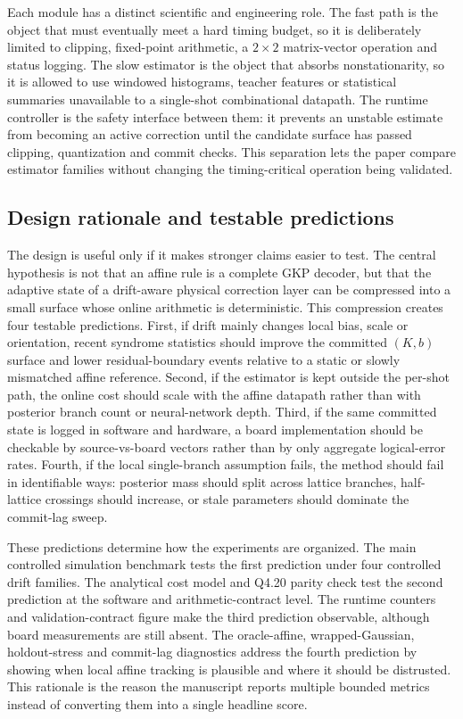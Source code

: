 \documentclass[11pt]{article}
\newcommand{\softwarehil}{controlled simulation}
\begin{document}
Each module has a distinct scientific and engineering role.  The fast path is
the object that must eventually meet a hard timing budget, so it is deliberately
limited to clipping, fixed-point arithmetic, a \(2\times2\) matrix-vector
operation and status logging.  The slow estimator is the object that absorbs
nonstationarity, so it is allowed to use windowed histograms, teacher features
or statistical summaries unavailable to a single-shot combinational datapath.
The runtime controller is the safety interface between them: it prevents an
unstable estimate from becoming an active correction until the candidate
surface has passed clipping, quantization and commit checks.  This separation
lets the paper compare estimator families without changing the timing-critical
operation being validated.

\subsection{Design rationale and testable predictions}

The design is useful only if it makes stronger claims easier to test.  The
central hypothesis is not that an affine rule is a complete GKP decoder, but
that the adaptive state of a drift-aware physical correction layer can be
compressed into a small surface whose online arithmetic is deterministic.  This
compression creates four testable predictions.  First, if drift mainly changes
local bias, scale or orientation, recent syndrome statistics should improve the
committed \((K,b)\) surface and lower residual-boundary events relative to a
static or slowly mismatched affine reference.  Second, if the estimator is kept
outside the per-shot path, the online cost should scale with the affine
datapath rather than with posterior branch count or neural-network depth.
Third, if the same committed state is logged in software and hardware, a board
implementation should be checkable by source-vs-board vectors
rather than by only aggregate logical-error rates.  Fourth, if the local
single-branch assumption fails, the method should fail in identifiable ways:
posterior mass should split across lattice branches, half-lattice crossings
should increase, or stale parameters should dominate the commit-lag sweep.

These predictions determine how the experiments are organized.  The main
\softwarehil{} benchmark tests the first prediction under four controlled
drift families.  The analytical cost model and Q4.20 parity check test the
second prediction at the software and arithmetic-contract level.  The runtime
counters and validation-contract figure make the third prediction observable,
although board measurements are still absent.  The oracle-affine,
wrapped-Gaussian, holdout-stress and commit-lag diagnostics address the fourth
prediction by showing when local affine tracking is plausible and where it
should be distrusted.  This rationale is the reason the manuscript reports
multiple bounded metrics instead of converting them into a single headline
score.
\end{document}
